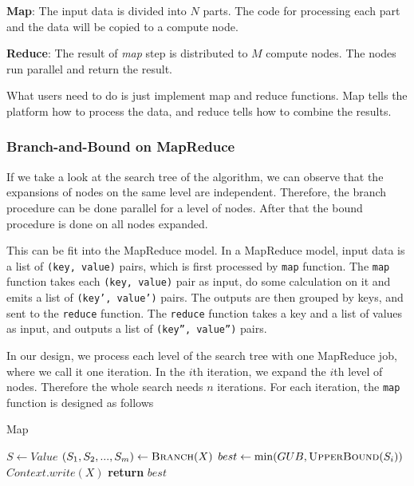 \noindent \textbf{Map}: The input data is divided into $N$ parts. The code for processing each part and the data will be copied to a compute node.

\noindent \textbf{Reduce}: The result of \textit{map} step is distributed to $M$ compute nodes. The nodes run parallel and return the result.

What users need to do is just implement map and reduce functions. Map tells the platform how to process the data, and reduce tells how to combine the results.

\subsubsection{Branch-and-Bound on MapReduce}
\noindent If we take a look at the search tree of the algorithm, we can observe that the expansions of nodes on the same level are independent. Therefore, the branch procedure can be done parallel for a level of nodes. After that the bound procedure is done on all nodes expanded.

This can be fit into the MapReduce model. In a MapReduce model, input data is a list of \texttt{(key, value)} pairs, which is first processed by \texttt{map} function. The \texttt{map} function takes each \texttt{(key, value)} pair as input, do some calculation on it and emits a list of \texttt{(key', value')} pairs. The outputs are then grouped by keys, and sent to the \texttt{reduce} function. The \texttt{reduce} function takes a key and a list of values as input, and outputs a list of \texttt{(key'', value'')} pairs.

In our design, we process each level of the search tree with one MapReduce job, where we call it one iteration. In the $i$th iteration, we expand the $i$th level of nodes. Therefore the whole search needs $n$ iterations. For each iteration, the \texttt{map} function is designed as follows
\begin{algorithm}
\caption{Map}
\begin{algorithmic}[1]
    \State $S \gets Value$
    \State $(S_1,S_2,...,S_m) \gets \textsc{Branch}(X)$
        \State $best \gets \min(GUB, \textsc{UpperBound}(S_i))$
    \EndFor
            \State $Context.write(X)$
        \EndIf
    \EndFor
    \State \textbf{return }$best$
\EndFunction
\end{algorithmic}
\end{algorithm}

